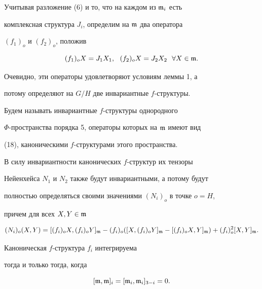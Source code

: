 Учитывая разложение (6) и то, что на каждом из $\frak{m}_i$ есть


комплексная структура $J_i$, определим на $\frak{m}$ два оператора


$(f_1)_o$ и $(f_2)_o$, положив 


\begin{equation}\label{18}


(f_1)_oX=J_1X_1,\ \ (f_2)_oX=J_2X_2\ \ \forall X \in \frak{m}.


\end{equation}


Очевидно, эти операторы удовлетворяют условиям леммы 1, а


потому определяют на $G/H$ две инвариантные $f$-структуры.





\begin{defn}


Будем называть инвариантные $f$-структуры однородного


$\Phi$-пространства порядка 5, операторы которых на $\frak{m}$ имеют вид


(18), каноническими $f$-структурами этого пространства.


\end{defn}





В силу инвариантности канонических $f$-структур их тензоры


Нейенхейса $N_1$ и $N_2$ также будут инвариантными, а потому будут


полностью определяться своими значениями $(N_i)_o$ в точке $o=H$,


причем для всех $X,Y \in \frak{m}$


$$


(N_i)_o(X,Y)=[(f_i)_oX,(f_i)_oY]_{\frak{m}}-(f_i)_o([X,(f_i)_oY]_{\frak{m}}-


[(f_i)_oX,Y]_{\frak{m}})+(f_i)_o^2[X,Y]_{\frak{m}}.


$$





\begin{thm}


Каноническая $f$-структура $f_i$ интегрируема


тогда и только тогда, когда


\begin{equation}\label{19}


[\frak{m},\frak{m}]_i=[\frak{m}_i,\frak{m}_i]_{3-i}=0.


\end{equation}


\end{thm}





